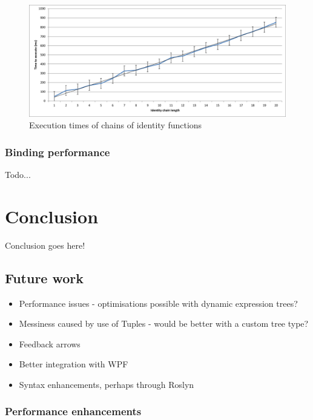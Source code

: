 \documentclass[12pt,twoside,notitlepage]{report}
\begin{document}
\begin{figure}[!ht]
  \centering
  \includegraphics[width=\textwidth]{fig/IdentityChains.pdf}
  \caption{Execution times of chains of identity functions}
  \label{fig:arrow_chaining_overhead}
\end{figure}

\subsection{Binding performance}

Todo...

\cleardoublepage



\chapter{Conclusion}

Conclusion goes here!

\section{Future work}

\begin{itemize}
	\item Performance issues - optimisations possible with dynamic expression trees?
	\item Messiness caused by use of Tuples - would be better with a custom tree type?
	\item Feedback arrows
	\item Better integration with WPF
	\item Syntax enhancements, perhaps through Roslyn
\end{itemize}

\subsection{Performance enhancements} \label{sec:performance_enhancements}
\end{document}
